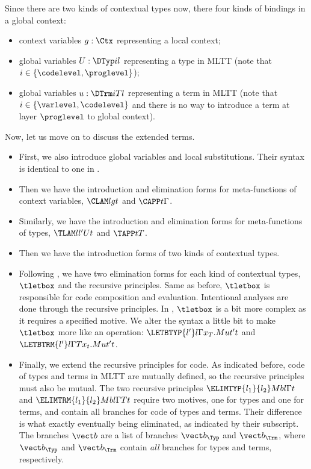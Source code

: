 Since there are two kinds of contextual types now, there four kinds of bindings in a
global context:
\begin{itemize}
\item context variables $g : \Ctx$ representing a local context;
\item global variables $U : \DTyp i l$ representing a type in MLTT (note that $i \in
  \{\codelevel, \proglevel\}$);
\item global variables $u : \DTrm i T l$ representing a term in MLTT (note that
  $i \in \{\varlevel, \codelevel\}$ and there is no way to introduce a term at layer $\proglevel$ to global
  context).
\end{itemize}

Now, let us move on to discuss the extended terms. %
\begin{itemize}
\item First, we also introduce global variables and local substitutions. %
  Their syntax is identical to one in . 
\item Then we have the introduction and elimination forms for meta-functions of
  context variables, $\CLAM l g t$ and $\CAPP t \Gamma$. 
\item Similarly, we have the introduction and elimination forms for meta-functions of
  types, $\TLAM l{l'} U t$ and $\TAPP t T$. 
\item Then we have the introduction forms of two kinds of contextual types.
\item Following \citet[Sec. 4]{hu2024layered}, we have two elimination forms for each kind of
  contextual types, $\tletbox$ and the recursive principles. %
  Same as before, $\tletbox$ is responsible for code composition and evaluation. %
  Intentional analyses are done through the recursive principles. %
  In \delamlang, $\tletbox$ is a bit more complex as it requires a specified motive. %
  We alter the syntax a little bit to make $\tletbox$ more like an operation:
  $\LETBTYP{l'}l\Gamma{x_T. M}{u}{t'}t$ and $\LETBTRM{l'}l\Gamma T{x_t. M}{u}{t'}t$.

\item Finally, we extend the recursive principles for code. %
  As indicated before, code of types and terms in MLTT are mutually defined, so the
  recursive principles must also be mutual. %
  The two recursive principles $\ELIMTYP{l_1}{l_2}Mbl\Gamma t$ and
  $\ELIMTRM{l_1}{l_2}Mbl\Gamma T t$ require two motives, one for types and one for terms,
  and contain all branches for code of types and terms. %
  Their difference is what exactly eventually being eliminated, as indicated by their
  subscript. %
  The branches $\vect b$ are a list of branches $\vect b_\Typ$ and $\vect b_\Trm$,
  where $\vect b_\Typ$ and $\vect b_\Trm$ contain \emph{all} branches for types and
  terms, respectively. %

\end{itemize}
